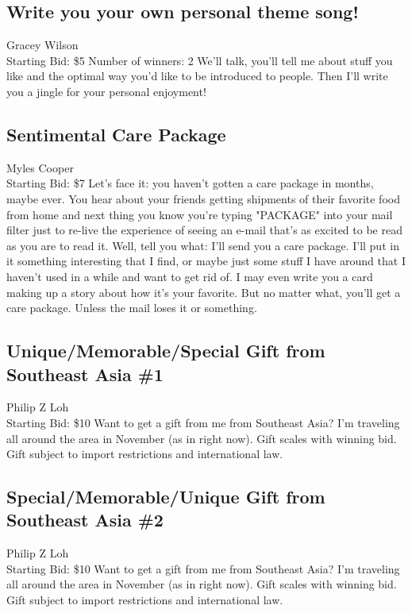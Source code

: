\documentclass[11pt]{article}
\begin{document}
\subsection{Write you your own personal theme song!}
Gracey Wilson
\\
Starting Bid: \$5
\newline
Number of winners: 2
\newline
We'll talk, you'll tell me about stuff you like and the optimal way you'd like to be introduced to people. Then I'll write you a jingle for your personal enjoyment!
\subsection{Sentimental Care Package}
Myles Cooper
\\
Starting Bid: \$7
\newline
Let's face it: you haven't gotten a care package in months, maybe ever. You hear about your friends getting shipments of their favorite food from home and next thing you know you're typing "PACKAGE" into your mail filter just to re-live the experience of seeing an e-mail that's as excited to be read as you are to read it. Well, tell you what: I'll send you a care package. I'll put in it something interesting that I find, or maybe just some stuff I have around that I haven't used in a while and want to get rid of. I may even write you a card making up a story about how it's your favorite. But no matter what, you'll get a care package. Unless the mail loses it or something.
\subsection{Unique/Memorable/Special Gift from Southeast Asia \#1}
Philip Z Loh
\\
Starting Bid: \$10
\newline
Want to get a gift from me from Southeast Asia? I'm traveling all around the area in November (as in right now). Gift scales with winning bid. Gift subject to import restrictions and international law.
\subsection{Special/Memorable/Unique Gift from Southeast Asia \#2}
Philip Z Loh
\\
Starting Bid: \$10
\newline
Want to get a gift from me from Southeast Asia? I'm traveling all around the area in November (as in right now). Gift scales with winning bid. Gift subject to import restrictions and international law.
\end{document}
